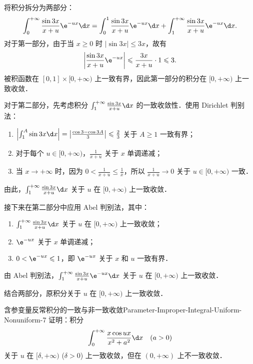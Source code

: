 \begin{myproof}
    将积分拆分为两部分：
    \begin{equation}\label{eq:split-integral-1}
        \int_0^{+\infty} \frac{\sin 3x}{x+u} \e^{-ux} \d x = \int_0^1 \frac{\sin 3x}{x+u} \e^{-ux} \d x + \int_1^{+\infty} \frac{\sin 3x}{x+u} \e^{-ux} \d x.
    \end{equation}
    对于第一部分，由于当 $x \geqslant 0$ 时 $|\sin 3x| \leqslant 3x$，故有
    \begin{equation}\label{eq:bound-part1-2}
        \left| \frac{\sin 3x}{x+u} \e^{-ux} \right| \leqslant \frac{3x}{x+u} \cdot 1 \leqslant 3.
    \end{equation}
    被积函数在 $[0, 1] \times [0, +\infty)$ 上一致有界，因此第一部分的积分在 $[0, +\infty)$ 上一致收敛．

    对于第二部分，先考虑积分 $\int_1^{+\infty} \frac{\sin 3x}{x+u} \d x$ 的一致收敛性．使用 Dirichlet 判别法：
    \begin{enumerate}
        \item $\left| \int_1^A \sin 3x \d x \right| = \left| \frac{\cos 3 - \cos 3A}{3} \right| \leqslant \frac{2}{3}$ 关于 $A \geqslant 1$ 一致有界；
        \item 对于每个 $u \in [0, +\infty)$，$\frac{1}{x+u}$ 关于 $x$ 单调递减；
        \item 当 $x \to +\infty$ 时，因为 $0 < \frac{1}{x+u} \leqslant \frac{1}{x}$，所以 $\frac{1}{x+u} \to 0$ 关于 $u \in [0, +\infty)$ 一致．
    \end{enumerate}
    由此，$\int_1^{+\infty} \frac{\sin 3x}{x+u} \d x$ 关于 $u$ 在 $[0, +\infty)$ 上一致收敛．

    接下来在第二部分中应用 Abel 判别法，其中：
    \begin{enumerate}
        \item $\int_1^{+\infty} \frac{\sin 3x}{x+u} \d x$ 关于 $u$ 在 $[0, +\infty)$ 上一致收敛；
        \item $\e^{-ux}$ 关于 $x$ 单调递减；
        \item $0 < \e^{-ux} \leqslant 1$，即 $\e^{-ux}$ 关于 $x$ 和 $u$ 一致有界．
    \end{enumerate}
    由 Abel 判别法，$\int_1^{+\infty} \frac{\sin 3x}{x+u} \e^{-ux} \d x$ 关于 $u$ 在 $[0, +\infty)$ 上一致收敛．

    结合两部分，原积分关于 $u$ 在 $[0, +\infty)$ 上一致收敛．
\end{myproof}

\begin{problem}{含参变量反常积分的一致与非一致收敛}{Parameter-Improper-Integral-Uniform-Nonuniform-7}
    证明：积分
    \begin{equation}\label{eq:q7-integral-1}
        \int_0^{+\infty} \frac{x \cos ux}{x^2 + a^2} \d x \quad (a > 0)
    \end{equation}
    关于 $u$ 在 $[\delta, +\infty)$ ($\delta > 0$) 上一致收敛，但在 $(0, +\infty)$ 上不一致收敛．
\end{problem}


